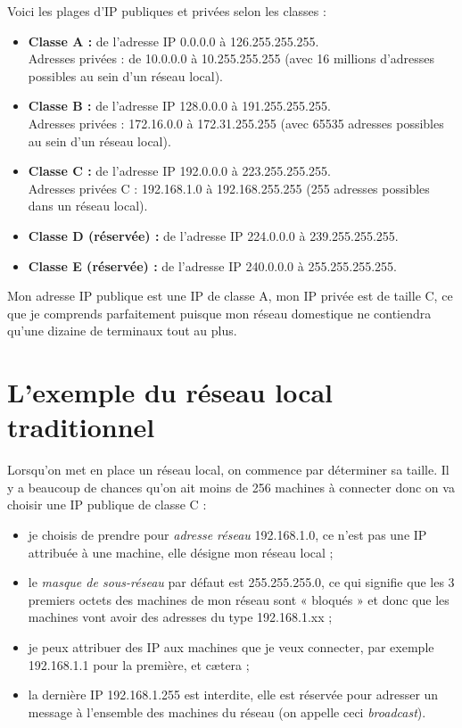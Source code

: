 Voici les plages d'IP publiques et privées selon les classes :
\begin{itemize}[]
    \item    \textbf{Classe A :} de l'adresse IP 0.0.0.0 à 126.255.255.255.\\
          Adresses privées : de 10.0.0.0 à 10.255.255.255 (avec 16 millions d'adresses possibles au sein d'un réseau local).

    \item    \textbf{Classe B :} de l'adresse IP 128.0.0.0 à 191.255.255.255.\\
          Adresses privées : 172.16.0.0 à 172.31.255.255 (avec 65535 adresses possibles au sein d'un réseau local).
    \item    \textbf{Classe C :} de l'adresse IP 192.0.0.0 à 223.255.255.255.\\
          Adresses privées C : 192.168.1.0 à 192.168.255.255 (255 adresses possibles dans un réseau local).
    \item    \textbf{Classe D (réservée) :} de l'adresse IP 224.0.0.0 à 239.255.255.255.
    \item    \textbf{Classe E (réservée) :} de l'adresse IP 240.0.0.0 à 255.255.255.255.
\end{itemize}

\begin{exemple}[]
    Mon adresse IP publique est une IP de classe A, mon IP privée est de taille C, ce que je comprends parfaitement puisque mon réseau domestique ne contiendra qu'une dizaine de terminaux tout au plus.
\end{exemple}


\section{L'exemple du réseau local traditionnel}

Lorsqu'on met en place un réseau local, on commence par déterminer sa taille. Il y a beaucoup de chances qu'on ait moins de 256 machines à connecter donc on va choisir une IP publique de classe C :
\begin{itemize}
    \item    je choisis de prendre pour \textit{adresse réseau} 192.168.1.0, ce n'est pas une IP attribuée à une machine, elle désigne mon réseau local ;
    \item    le \textit{masque de sous-réseau} par défaut est 255.255.255.0, ce qui signifie que les 3 premiers octets des machines de mon réseau sont « bloqués » et donc que les machines vont avoir des adresses du type 192.168.1.xx ;
    \item    je peux attribuer des IP aux machines que je veux connecter, par exemple 192.168.1.1 pour la première, et c\ae tera ;
    \item    la dernière IP 192.168.1.255 est interdite, elle est réservée pour adresser un message à l'ensemble des machines du réseau (on appelle ceci \textit{broadcast}).
\end{itemize}

